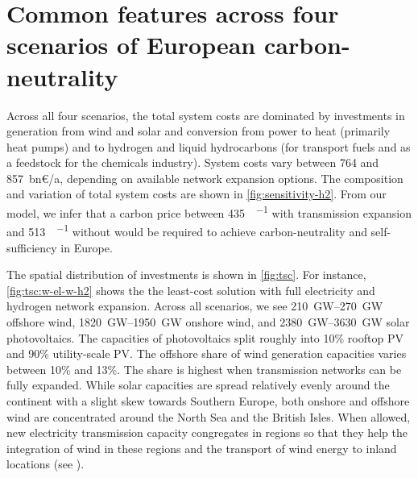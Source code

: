 \section*{Common features across four scenarios of European carbon-neutrality}
\label{sec:es}


Across all four scenarios, the total system costs are dominated by investments
in generation from wind and solar and conversion from power to heat (primarily
heat pumps) and to hydrogen and liquid hydrocarbons (for transport fuels and as
a feedstock for the chemicals industry). System costs vary between 764 and
857~bn\euro/a, depending on available network expansion options. The composition
and variation of total system costs are shown in \cref{fig:sensitivity-h2}. From
our model, we infer that a carbon price between \SI{435}{\sieuro\per\tco} with
transmission expansion and \SI{513}{\sieuro\per\tco} without would be required
to achieve carbon-neutrality and self-sufficiency in Europe.


The spatial distribution of investments is shown in \cref{fig:tsc}. For
instance, \cref{fig:tsc:w-el-w-h2} shows the the least-cost solution with full
electricity and hydrogen network expansion. Across all scenarios, we see
\SIrange{210}{270}{\giga\watt} offshore wind, \SIrange{1820}{1950}{\giga\watt}
onshore wind, and \SIrange{2380}{3630}{\giga\watt} solar photovoltaics. The
capacities of photovoltaics split roughly into 10\% rooftop PV and 90\%
utility-scale PV. The offshore share of wind generation capacities varies
between 10\% and 13\%. The share is highest when transmission networks can be
fully expanded. While solar capacities are spread relatively evenly around the
continent with a slight skew towards Southern Europe, both onshore and offshore
wind are concentrated around the North Sea and the British Isles. When allowed,
new electricity transmission capacity congregates in regions so that they help
the integration of wind in these regions and the transport of wind energy to
inland locations (see ).


